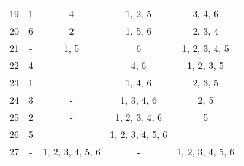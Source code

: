 \begin{table*}[h]
\begin{center}
\begin{tabular}{c c c c c}
19			&	1			&	4					&	1, 2, 5 			&	3, 4, 6 			\\
20			&	6			&	2					&	1, 5, 6 			&	2, 3, 4 			\\
21			&	-			&	1, 5				&	6 					&	1, 2, 3, 4, 5 		\\
22			&	4			&	-					&	4, 6 				&	1, 2, 3, 5			\\
23			&	1			&	-					&	1, 4, 6 			&	2, 3, 5 			\\
24			&	3			&	-					&	1, 3, 4, 6 			&	2, 5 				\\
25			&	2			&	-					&	1, 2, 3, 4, 6 		&	5 					\\
26			&	5			&	-					&	1, 2, 3, 4, 5, 6	&	- 					\\
27			&	-			&	1, 2, 3, 4, 5, 6	&	-					&	1, 2, 3, 4, 5, 6	\\

\end{tabular}
\end{center}
\label{tab:diffsiginit}

\end{table*}

\bigskip


